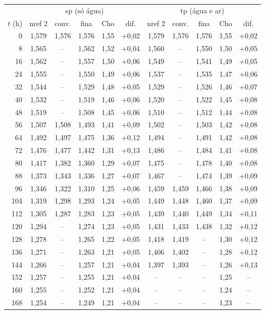 \begin{tabular}{r|ccccc|ccccc}
\toprule
 & \multicolumn{5}{c|}{sp (só água)} & \multicolumn{5}{c}{tp (água e ar)}\\
$t$ (h) & nref 2 & conv. & fina & Cho & dif. & nref 2 & conv. & fina & Cho & dif.\\
\midrule
0 & 1{,}579 & 1{,}576 & 1{,}576 & 1{,}55 & +0{,}02 & 1{,}579 & 1{,}576 & 1{,}576 & 1{,}55 & +0{,}02\\
8 & 1{,}565 & -- & 1{,}562 & 1{,}52 & +0{,}04 & 1{,}560 & -- & 1{,}550 & 1{,}50 & +0{,}05\\
16 & 1{,}562 & -- & 1{,}557 & 1{,}50 & +0{,}06 & 1{,}549 & -- & 1{,}541 & 1{,}49 & +0{,}05\\
24 & 1{,}555 & -- & 1{,}550 & 1{,}49 & +0{,}06 & 1{,}537 & -- & 1{,}535 & 1{,}47 & +0{,}06\\
32 & 1{,}544 & -- & 1{,}529 & 1{,}48 & +0{,}05 & 1{,}529 & -- & 1{,}526 & 1{,}46 & +0{,}07\\
40 & 1{,}532 & -- & 1{,}519 & 1{,}46 & +0{,}06 & 1{,}520 & -- & 1{,}522 & 1{,}45 & +0{,}08\\
48 & 1{,}519 & -- & 1{,}508 & 1{,}45 & +0{,}06 & 1{,}510 & -- & 1{,}512 & 1{,}44 & +0{,}08\\
56 & 1{,}507 & 1{,}508 & 1{,}493 & 1{,}41 & +0{,}09 & 1{,}502 & -- & 1{,}503 & 1{,}42 & +0{,}08\\
64 & 1{,}492 & 1{,}497 & 1{,}475 & 1{,}36 & +0{,}12 & 1{,}494 & -- & 1{,}491 & 1{,}42 & +0{,}08\\
72 & 1{,}476 & 1{,}477 & 1{,}442 & 1{,}31 & +0{,}13 & 1{,}486 & -- & 1{,}484 & 1{,}41 & +0{,}08\\
80 & 1{,}417 & 1{,}382 & 1{,}360 & 1{,}29 & +0{,}07 & 1{,}475 & -- & 1{,}478 & 1{,}40 & +0{,}08\\
88 & 1{,}373 & 1{,}343 & 1{,}336 & 1{,}27 & +0{,}07 & 1{,}467 & -- & 1{,}474 & 1{,}39 & +0{,}09\\
96 & 1{,}346 & 1{,}322 & 1{,}310 & 1{,}25 & +0{,}06 & 1{,}459 & 1{,}459 & 1{,}466 & 1{,}38 & +0{,}09\\
104 & 1{,}319 & 1{,}298 & 1{,}293 & 1{,}24 & +0{,}05 & 1{,}449 & 1{,}448 & 1{,}460 & 1{,}37 & +0{,}09\\
112 & 1{,}305 & 1{,}287 & 1{,}283 & 1{,}23 & +0{,}05 & 1{,}439 & 1{,}440 & 1{,}449 & 1{,}34 & +0{,}11\\
120 & 1{,}294 & -- & 1{,}274 & 1{,}23 & +0{,}05 & 1{,}431 & 1{,}433 & 1{,}438 & 1{,}32 & +0{,}12\\
128 & 1{,}278 & -- & 1{,}265 & 1{,}22 & +0{,}05 & 1{,}418 & 1{,}419 & -- & 1{,}30 & +0{,}12\\
136 & 1{,}271 & -- & 1{,}263 & 1{,}21 & +0{,}05 & 1{,}406 & 1{,}402 & -- & 1{,}28 & +0{,}12\\
144 & 1{,}266 & -- & 1{,}257 & 1{,}21 & +0{,}04 & 1{,}397 & 1{,}393 & -- & 1{,}26 & +0{,}13\\
152 & 1{,}257 & -- & 1{,}255 & 1{,}21 & +0{,}04 & -- & -- & -- & 1{,}25 & --\\
160 & 1{,}255 & -- & 1{,}252 & 1{,}21 & +0{,}04 & -- & -- & -- & 1{,}24 & --\\
168 & 1{,}254 & -- & 1{,}249 & 1{,}21 & +0{,}04 & -- & -- & -- & 1{,}23 & --\\
\bottomrule
\end{tabular}
